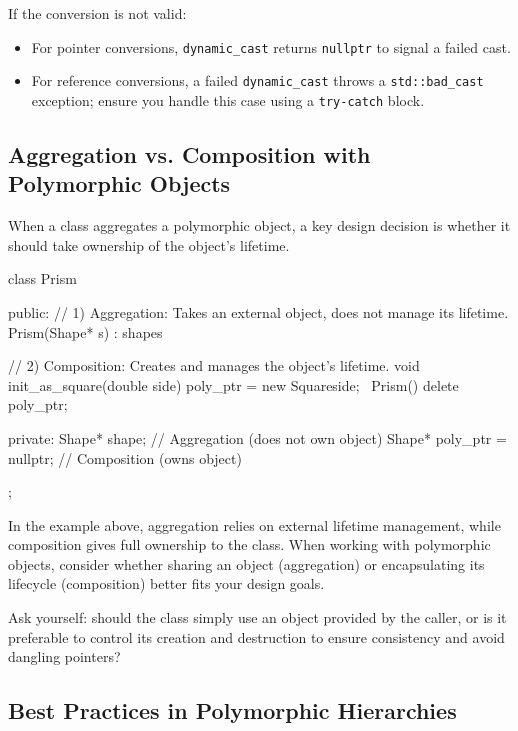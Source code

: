If the conversion is not valid:
\begin{itemize}
    \item For pointer conversions, \texttt{dynamic\_cast} returns \texttt{nullptr} to signal a failed cast.
    \item For reference conversions, a failed \texttt{dynamic\_cast} throws a \texttt{std::bad\_cast} exception; ensure you handle this case using a \texttt{try-catch} block.
\end{itemize}

\subsection{Aggregation vs. Composition with Polymorphic Objects}

When a class aggregates a polymorphic object, a key design decision is whether it should take ownership of the object's lifetime.

\begin{codeblock}[language=C++]
class Prism {
public:
    // 1) Aggregation: Takes an external object, does not manage its lifetime.
    Prism(Shape* s) : shape{s} {}

    // 2) Composition: Creates and manages the object's lifetime.
    void init_as_square(double side) {
        poly_ptr = new Square{side};
    }
    ~Prism() { delete poly_ptr; }

private:
    Shape* shape;  // Aggregation (does not own object)
    Shape* poly_ptr = nullptr; // Composition (owns object)
};
\end{codeblock}

In the example above, aggregation relies on external lifetime management, while composition gives full ownership to the class. When working with polymorphic objects, consider whether sharing an object (aggregation) or encapsulating its lifecycle (composition) better fits your design goals.

\vspace{0.5em}

Ask yourself: should the class simply use an object provided by the caller, or is it preferable to control its creation and destruction to ensure consistency and avoid dangling pointers?

\subsection{Best Practices in Polymorphic Hierarchies}

